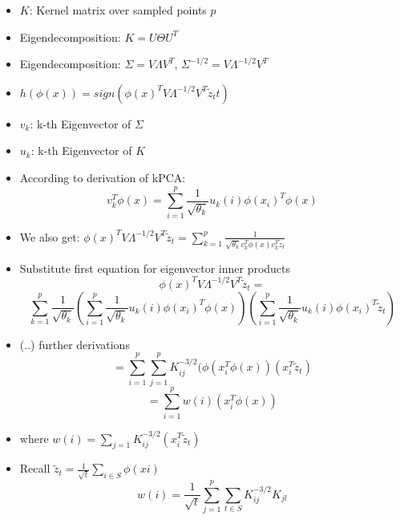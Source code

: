 \documentclass[12pt,a4paper]{beamer}
\begin{document}
\begin{frame}
\begin{itemize}
\item $K$: Kernel matrix over sampled points $p$
\item Eigendecomposition: $K=U \Theta U^{T}$
\item Eigendecomposition: $ \Sigma = V \Lambda V^{T} $, $ \Sigma^{-1/2} = V \Lambda^{-1/2} V^{T}$
\item $h(\phi(x)) = sign(\phi(x)^T V \Lambda^{-1/2} V^{T} \tilde z_t{t})$
\item $v_{k}$: k-th Eigenvector of $\Sigma$
\item $u_{k}$: k-th Eigenvector of $K$
\end{itemize}
\end{frame}

\begin{frame}
\begin{itemize}
\item According to derivation of kPCA:
$$ v_{k}^{T} \phi (x) = \sum_{i=1}^{p}  \frac{1}{ \sqrt{ \theta_{k} } } u_{k}(i) \phi (x_{i})^{T} \phi (x)  $$
\item We also get: $ \phi(x)^{T} V \Lambda^{-1/2} V^{T} \tilde z_{t} = \sum_{k=1}^{p} \frac{1}{\sqrt{\theta_{k}} v_{k}^{T} \phi(x) v_{k}^{T} \tilde z_{t} }$
\item Substitute first equation for eigenvector inner products
$$ \phi(x)^{T} V \Lambda^{-1/2} V^{T} \tilde z_{t} = $$
$$\sum_{k=1}^{p} \frac{1}{\sqrt{\theta_{k}}} 
(\sum_{i=1}^{p} \frac{1}{ \sqrt{\theta_{k}} } u_{k}(i) \phi (x_{i})^{T} \phi (x) )
(\sum_{i=1}^{p} \frac{1}{ \sqrt{\theta_{k}} } u_{k}(i) \phi (x_{i})^{T} \tilde z_{t}  )
$$
\end{itemize}
\end{frame}

\begin{frame}
\begin{itemize}
\item (..) further derivations
$$ = \sum_{i=1}^{p}\sum_{j=1}^{p} K_{ij}^{-3/2}(\phi ( x_{i}^{T} \phi (x) ) (  x_{i}^{T} \tilde z_{t}  ) $$
$$ = \sum_{i=1}^{p} w(i) (  x_{i}^{T} \phi (x) ) $$
\item where $w(i) = \sum_{j=1} K_{ij}^{-3/2} (  x_{i}^{T} \tilde z_{t}) $
\item Recall $\tilde z_{t} = \frac{1} {\sqrt{t}} \sum_{i \in S}{\phi (xi)} $
$$w(i) = \frac{1}{\sqrt{t}}\sum_{j=1}^{p}\sum_{t \in S} K_{ij}^{-3/2} K_{jl} $$
\end{itemize}
\end{frame}
\end{document}
